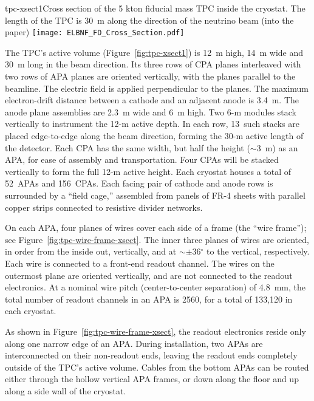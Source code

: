 
\begin{cdrfigure}{tpc-xsect1}{Cross section of the 5 kton fiducial mass TPC inside the cryostat.  The length of the TPC is  30~m along the direction of the neutrino beam (into the paper)}
\texttt{[image: ELBNF\_FD\_Cross\_Section.pdf]}
\end{cdrfigure}


The TPC's active volume (Figure~\ref{fig:tpc-xsect1}) is 12~m high, 14~m wide and 30~m long in the beam direction. 
Its three rows of CPA planes interleaved with two rows of APA planes 
are oriented vertically, with the planes parallel to the beamline. The  
electric field is applied perpendicular to the planes.
The maximum electron-drift distance between a cathode and an adjacent 
anode is 3.4~m. The anode plane assemblies are 
2.3~m wide and 6~m high. Two 6-m modules stack vertically to 
instrument the 12-m active depth. In each row, 13~such stacks are placed 
edge-to-edge 
along the beam direction, forming the 30-m active length of the detector.  Each CPA has the same width, but half the height ($\sim$3~m) as an APA, for ease of assembly and transportation.  Four CPAs will be stacked vertically to form the full 12-m active height. 
Each cryostat houses a total of 52~APAs and 156~CPAs.
Each facing pair of cathode and anode rows is surrounded by a 
``field cage,'' assembled from panels of FR-4 sheets with parallel copper strips connected to resistive divider networks. 

On each APA, four planes of wires cover each side of a frame (the ``wire frame''); see Figure~\ref{fig:tpc-wire-frame-xsect}.
The inner three planes of wires are oriented, in order from the inside out, vertically, and at $\sim\pm$36$^\circ$ 
to the vertical, respectively.
 Each wire is connected to a front-end readout channel.
The wires on the outermost plane are oriented vertically, and are not connected to the readout electronics.
At a nominal wire pitch (center-to-center separation) of 4.8~mm,
the total number of readout channels in an APA is 2560, for a total of 133,120 in each cryostat.
 
As shown in Figure~\ref{fig:tpc-wire-frame-xsect}, the readout electronics reside only along one narrow edge of an APA. 
During installation, two APAs are interconnected on their non-readout ends, leaving the readout ends completely outside of the TPC's active volume.  Cables from the bottom APAs can be routed either through the hollow vertical APA frames, or down along the floor and up along a side wall of the cryostat.

